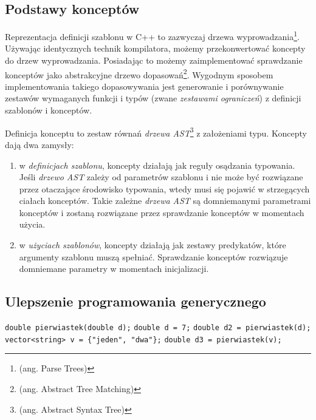 \documentclass[11pt, a4paper]{article}
\begin{document}
\subsection{Podstawy konceptów}

Reprezentacja definicji szablonu w C++ to zazwyczaj drzewa wyprowadzania\footnote{(ang. Parse Trees)}. Używając identycznych technik kompilatora, możemy przekonwertować koncepty do drzew wyprowadzania. Posiadając to możemy zaimplementować sprawdzanie konceptów jako abstrakcyjne drzewo dopasowań\footnote{(ang. Abstract Tree Matching)}. Wygodnym sposobem implementowania takiego dopasowywania jest generowanie i porównywanie zestawów wymaganych funkcji i typów (zwane \emph{zestawami ograniczeń}) z definicji szablonów i konceptów.

Definicja konceptu to zestaw równań \emph{drzewa AST}\footnote{(ang. Abstract Syntax Tree)} z założeniami typu. Koncepty dają dwa zamysły:

\begin{enumerate}

\item w \emph{definicjach szablonu}, koncepty działają jak reguły osądzania typowania. Jeśli \emph{drzewo AST} zależy od parametrów szablonu i nie może być rozwiązane przez otaczające środowisko typowania, wtedy musi się pojawić w strzegących ciałach konceptów. Takie zależne \emph{drzewa AST} są domniemanymi parametrami konceptów i zostaną rozwiązane przez sprawdzanie konceptów w momentach użycia.

\item w \emph{użyciach szablonów}, koncepty działają jak zestawy predykatów, które argumenty szablonu muszą spełniać. Sprawdzanie konceptów rozwiązuje domniemane parametry w momentach inicjalizacji.

\end{enumerate}

\subsection{Ulepszenie programowania generycznego}
\verb#double pierwiastek(double d);# \newline
\verb#double d = 7;# \newline
\verb#double d2 = pierwiastek(d);# \newline
\verb#vector<string> v = {"jeden", "dwa"};# \newline
\verb#double d3 = pierwiastek(v);# \newline
\end{document}
